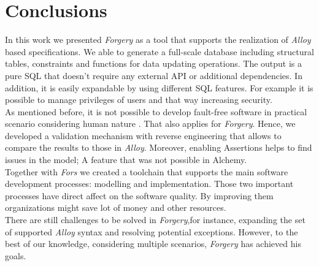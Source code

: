 \documentclass[oneside]{book}
\begin{document}
\newpage

\chapter{Conclusions}

In this work we presented \textit{Forgery} as a tool that supports the realization of \textit{Alloy} based specifications. We able to generate a full-scale database including structural tables, constraints and functions for data updating operations. The output is a pure SQL that doesn't require any external API or additional dependencies. In addition, it is easily expandable by using different SQL features. For example it is possible to manage privileges of users and that way increasing security.\\ 

As mentioned before, it is not possible to develop fault-free software in practical scenario considering human nature \cite{reliability}. That also applies for \textit{Forgery}. Hence, we developed a validation mechanism with reverse engineering that allows to compare the results to those in \textit{Alloy}. Moreover, enabling Assertions helps to find issues in the model; A feature that was not possible in Alchemy.\\

Together with \textit{Fors} we created a toolchain that supports the main software development processes: modelling and implementation. Those two important processes have direct affect on the software quality. By improving them organizations might save lot of money and other resources.\\

There are still challenges to be solved in \textit{Forgery},for instance, expanding the set of supported \textit{Alloy} syntax and resolving potential exceptions. However, to the best of our knowledge, considering multiple scenarios, \textit{Forgery} has achieved his goals. 
\end{document}
